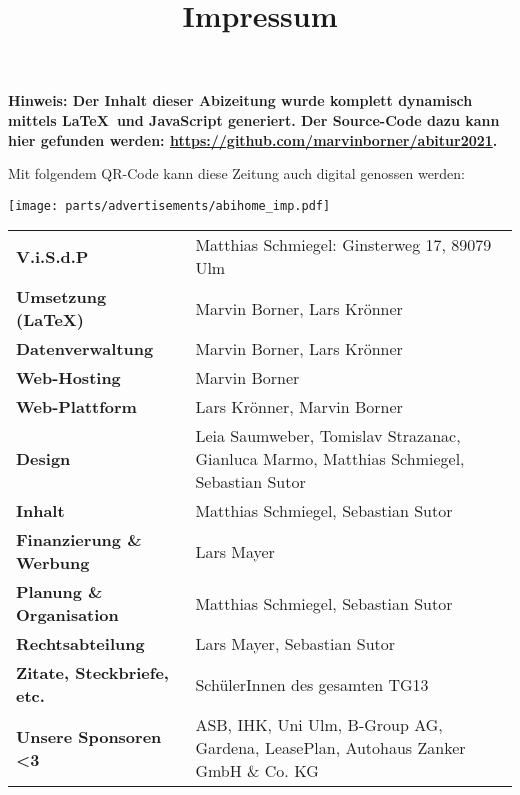 \title{Impressum}


\textbf{Hinweis: Der Inhalt dieser Abizeitung wurde komplett dynamisch mittels \LaTeX\  und JavaScript generiert. Der Source-Code dazu kann hier gefunden werden: \url{https://github.com/marvinborner/abitur2021}.}

Mit folgendem QR-Code kann diese Zeitung auch digital genossen werden:

\begin{center}
\end{center}

\texttt{[image: parts/advertisements/abihome\_imp.pdf]}

\begin{table}[b]
	\begin{tabular}{ l l }
		\textbf{V.i.S.d.P}                 & Matthias Schmiegel: Ginsterweg 17, 89079 Ulm                                            \\
		\textbf{Umsetzung (\LaTeX)}        & Marvin Borner, Lars Krönner                                                             \\
		\textbf{Datenverwaltung}           & Marvin Borner, Lars Krönner                                                             \\
		\textbf{Web-Hosting}               & Marvin Borner                                                                           \\
		\textbf{Web-Plattform}             & Lars Krönner, Marvin Borner                                                             \\
		\textbf{Design}                    & Leia Saumweber, Tomislav Strazanac, Gianluca Marmo, Matthias Schmiegel, Sebastian Sutor \\
		\textbf{Inhalt}                    & Matthias Schmiegel, Sebastian Sutor                                                     \\
		\textbf{Finanzierung \& Werbung}   & Lars Mayer                                                                              \\
		\textbf{Planung \& Organisation}   & Matthias Schmiegel, Sebastian Sutor                                                     \\
		\textbf{Rechtsabteilung}           & Lars Mayer, Sebastian Sutor                                                             \\
		\textbf{Zitate, Steckbriefe, etc.} & SchülerInnen des gesamten TG13                                                          \\
		\textbf{Unsere Sponsoren <3}       & ASB, IHK, Uni Ulm, B-Group AG, Gardena, LeasePlan, Autohaus Zanker GmbH \& Co. KG
	\end{tabular}
\end{table}
